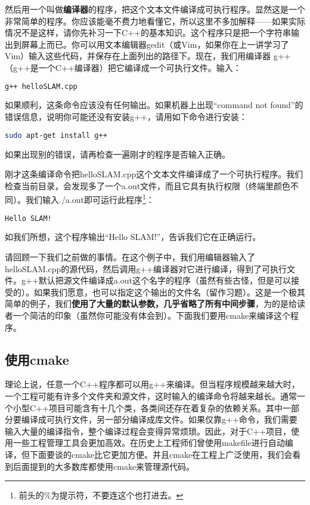 然后用一个叫做\textbf{编译器}的程序，把这个文本文件编译成可执行程序。显然这是一个非常简单的程序。你应该能毫不费力地看懂它，所以这里不多加解释——如果实际情况不是这样，请你先补习一下C++的基本知识。这个程序只是把一个字符串输出到屏幕上而已。你可以用文本编辑器gedit（或Vim，如果你在上一讲学习了Vim）输入这些代码，并保存在上面列出的路径下。现在，我们用编译器 g++ （g++是一个C++编译器）把它编译成一个可执行文件。输入：

\begin{lstlisting}[language=sh,caption=终端输入：]
g++ helloSLAM.cpp
\end{lstlisting}

如果顺利，这条命令应该没有任何输出。如果机器上出现“command not found”的错误信息，说明你可能还没有安装g++，请用如下命令进行安装：
\begin{lstlisting}[language=sh,caption=终端输入：]
sudo apt-get install g++
\end{lstlisting}
如果出现别的错误，请再检查一遍刚才的程序是否输入正确。

刚才这条编译命令把helloSLAM.cpp这个文本文件编译成了一个可执行程序。我们检查当前目录，会发现多了一个a.out文件，而且它具有执行权限（终端里颜色不同）。我们输入./a.out即可运行此程序\footnote{前头的\%为提示符，不要连这个也打进去。}：

\begin{lstlisting}[language=sh,caption=终端输入：]
% ./a.out
Hello SLAM!
\end{lstlisting}

如我们所想，这个程序输出“Hello SLAM!”，告诉我们它在正确运行。

请回顾一下我们之前做的事情。在这个例子中，我们用编辑器输入了helloSLAM.cpp的源代码，然后调用g++编译器对它进行编译，得到了可执行文件。g++默认把源文件编译成a.out这个名字的程序（虽然有些古怪，但是可以接受的）。如果我们愿意，也可以指定这个输出的文件名（留作习题）。这是一个极其简单的例子，我们\textbf{使用了大量的默认参数，几乎省略了所有中间步骤}，为的是给读者一个简洁的印象（虽然你可能没有体会到）。下面我们要用cmake来编译这个程序。

\subsection{使用cmake}
理论上说，任意一个C++程序都可以用g++来编译。但当程序规模越来越大时，一个工程可能有许多个文件夹和源文件，这时输入的编译命令将越来越长。通常一个小型C++项目可能含有十几个类，各类间还存在着复杂的依赖关系。其中一部分要编译成可执行文件，另一部分编译成库文件。如果仅靠g++命令，我们需要输入大量的编译指令，整个编译过程会变得异常烦琐。因此，对于C++项目，使用一些工程管理工具会更加高效。在历史上工程师们曾使用makefile进行自动编译，但下面要谈的cmake比它更加方便。并且cmake在工程上广泛使用，我们会看到后面提到的大多数库都使用cmake来管理源代码。

